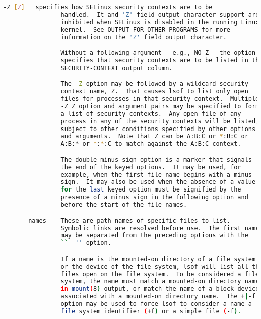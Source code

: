 {{\begin{lstlisting}[language=bash]
       -Z [Z]   specifies how SELinux security contexts are to be
                handled.  It and 'Z' field output character support are
                inhibited when SELinux is disabled in the running Linux
                kernel.  See OUTPUT FOR OTHER PROGRAMS for more
                information on the 'Z' field output character.

                Without a following argument - e.g., NO Z - the option
                specifies that security contexts are to be listed in the
                SECURITY-CONTEXT output column.

                The -Z option may be followed by a wildcard security
                context name, Z.  That causes lsof to list only open
                files for processes in that security context.  Multiple
                -Z Z option and argument pairs may be specified to form
                a list of security contexts.  Any open file of any
                process in any of the security contexts will be listed,
                subject to other conditions specified by other options
                and arguments.  Note that Z can be A:B:C or *:B:C or
                A:B:* or *:*:C to match against the A:B:C context.

       --       The double minus sign option is a marker that signals
                the end of the keyed options.  It may be used, for
                example, when the first file name begins with a minus
                sign.  It may also be used when the absence of a value
                for the last keyed option must be signified by the
                presence of a minus sign in the following option and
                before the start of the file names.

       names    These are path names of specific files to list.
                Symbolic links are resolved before use.  The first name
                may be separated from the preceding options with the
                ``--'' option.

                If a name is the mounted-on directory of a file system
                or the device of the file system, lsof will list all the
                files open on the file system.  To be considered a file
                system, the name must match a mounted-on directory name
                in mount(8) output, or match the name of a block device
                associated with a mounted-on directory name.  The +|-f
                option may be used to force lsof to consider a name a
                file system identifier (+f) or a simple file (-f).


\end{lstlisting}}}
